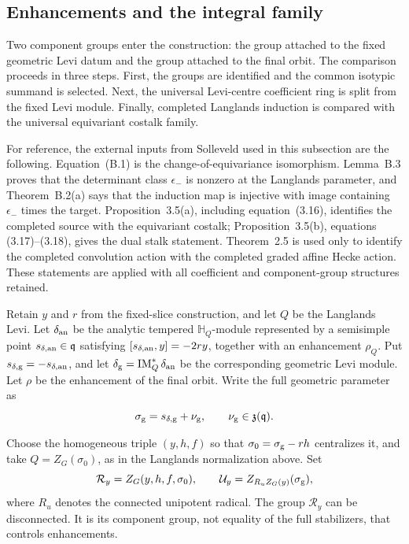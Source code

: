 \documentclass[11pt]{amsart}
\theoremstyle{definition}
\theoremstyle{remark}
\newcommand{\Hh}{\mathbb H}
\begin{document}
\subsection{Enhancements and the integral family}

Two component groups enter the construction: the group attached to the
fixed geometric Levi datum and the group attached to the final orbit.  The
comparison proceeds in three steps.  First, the groups are identified and
the common isotypic summand is selected.  Next, the universal Levi-centre
coefficient ring is split from the fixed Levi module.  Finally, completed
Langlands induction is compared with the universal equivariant costalk
family.

For reference, the external inputs from Solleveld used in this subsection
are the following.  Equation~(B.1) is the change-of-equivariance
isomorphism.  Lemma~B.3 proves that the determinant class $\epsilon_-$ is
nonzero at the Langlands parameter, and Theorem~B.2(a) says that the
induction map is injective with image containing $\epsilon_-$ times the
target.  Proposition~3.5(a), including equation~(3.16), identifies the
completed source with the equivariant costalk; Proposition~3.5(b), equations
(3.17)--(3.18), gives the dual stalk statement.  Theorem~2.5 is used only to
identify the completed convolution action with the completed graded affine
Hecke action.  These statements are applied with all coefficient and
component-group structures retained.

Retain $y$ and $r$ from the fixed-slice construction, and let $Q$ be the
Langlands Levi.  Let $\delta_{\rm an}$ be the analytic tempered
$\Hh_Q$-module represented by a semisimple point
$s_{\delta,{\rm an}}\in\mathfrak q$ satisfying
$[s_{\delta,{\rm an}},y]=-2ry$, together with an enhancement $\rho_Q$.
Put
$s_{\delta,{\rm g}}=-s_{\delta,{\rm an}}$, and let
$\delta_{\rm g}=\operatorname{IM}_Q^*\delta_{\rm an}$ be the corresponding
geometric Levi module.  Let $\rho$ be the enhancement of the final orbit.
Write the full
geometric parameter as
\[
 \sigma_{\rm g}=s_{\delta,{\rm g}}+\nu_{\rm g},
 \qquad \nu_{\rm g}\in\mathfrak z(\mathfrak q).
\]

Choose the homogeneous triple $(y,h,f)$ so that
$\sigma_0=\sigma_{\rm g}-rh$ centralizes it, and take
$Q=Z_G(\sigma_0)$, as in the Langlands normalization above.  Set
\[
 \mathcal R_y=Z_G(y,h,f,\sigma_0),\qquad
 \mathcal U_y=Z_{R_uZ_G(y)}(\sigma_{\rm g}),
\]
where $R_u$ denotes the connected unipotent radical.  The group
$\mathcal R_y$ can be disconnected.  It is its component group,
not equality of the full stabilizers, that controls enhancements.
\end{document}
